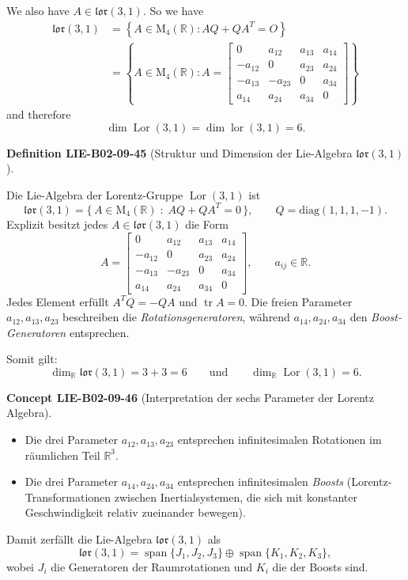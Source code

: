 \documentclass[10pt, letterpaper]{article}
\newcommand{\CustomHeading}[3]{%
  \par\medskip\noindent%
  \textbf{#1 #2} \textnormal{(#3)}.\enskip%
}
\newenvironment{DEF}[2]{\begin{unitbox}\CustomHeading{Definition}{#1}{#2}}{\end{unitbox}}
\newenvironment{CONC}[2]{\begin{unitbox}\CustomHeading{Concept}{#1}{#2}}{\end{unitbox}}
\begin{document}
We also have $A \in \mathfrak{l o r}(3,1)$. So we have
$$
\begin{aligned}
\mathfrak{l o r}(3,1) & =\left\{A \in \mathrm{M}_{4}(\mathbb{R}): A Q+Q A^{T}=O\right\} \\
& =\left\{A \in \mathrm{M}_{4}(\mathbb{R}): A=\left[\begin{array}{cccc}
0 & a_{12} & a_{13} & a_{14} \\
-a_{12} & 0 & a_{23} & a_{24} \\
-a_{13} & -a_{23} & 0 & a_{34} \\
a_{14} & a_{24} & a_{34} & 0
\end{array}\right]\right\}
\end{aligned}
$$
and therefore
$$
\operatorname{dim} \operatorname{Lor}(3,1)=\operatorname{dim} \operatorname{lor}(3,1)=6 .
$$


\begin{DEF}{LIE-B02-09-45}{Struktur und Dimension der Lie-Algebra \(\mathfrak{lor}(3,1)\)}
Die Lie-Algebra der Lorentz-Gruppe \(\operatorname{Lor}(3,1)\) ist
\[
\mathfrak{lor}(3,1)
=\bigl\{\,A\in \mathrm{M}_4(\mathbb{R})\;:\; A Q+Q A^{T}=0\,\bigr\},
\qquad
Q=\mathrm{diag}(1,1,1,-1).
\]
Explizit besitzt jedes \(A\in\mathfrak{lor}(3,1)\) die Form
\[
A=
\begin{bmatrix}
0 & a_{12} & a_{13} & a_{14}\\
-a_{12} & 0 & a_{23} & a_{24}\\
-a_{13} & -a_{23} & 0 & a_{34}\\
a_{14} & a_{24} & a_{34} & 0
\end{bmatrix},
\qquad a_{ij}\in\mathbb{R}.
\]
Jedes Element erfüllt \(A^{T}Q=-QA\) und \(\operatorname{tr}A=0\).
Die freien Parameter \(a_{12},a_{13},a_{23}\) beschreiben die
\emph{Rotationsgeneratoren}, während \(a_{14},a_{24},a_{34}\)
den \emph{Boost-Generatoren} entsprechen.

Somit gilt:
\[
\dim_{\mathbb{R}}\mathfrak{lor}(3,1)=3+3=6
\qquad\text{und}\qquad
\dim_{\mathbb{R}}\operatorname{Lor}(3,1)=6.
\]
\end{DEF}



\begin{CONC}{LIE-B02-09-46}{Interpretation der sechs Parameter der Lorentz Algebra}
\begin{itemize}
  \item Die drei Parameter \(a_{12},a_{13},a_{23}\) entsprechen infinitesimalen
  Rotationen im räumlichen Teil \(\mathbb{R}^3\).
  \item Die drei Parameter \(a_{14},a_{24},a_{34}\) entsprechen infinitesimalen
  \emph{Boosts} (Lorentz-Transformationen zwischen Inertialsystemen, die sich mit
  konstanter Geschwindigkeit relativ zueinander bewegen).
\end{itemize}
Damit zerfällt die Lie-Algebra \(\mathfrak{lor}(3,1)\) als
\[
\mathfrak{lor}(3,1)
=\operatorname{span}\{J_1,J_2,J_3\}\oplus\operatorname{span}\{K_1,K_2,K_3\},
\]
wobei \(J_i\) die Generatoren der Raumrotationen und \(K_i\) die der Boosts sind.
\end{CONC}
\end{document}
